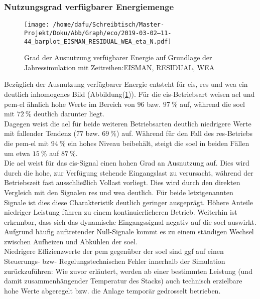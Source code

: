 \documentclass[onecolumn,10pt,titlepage]{article}
\begin{document}
\subsubsection{Nutzungsgrad verfügbarer Energiemenge}
\begin{figure}[H]
	\centering
	\texttt{[image: /home/dafu/Schreibtisch/Master-Projekt/Doku/Abb/Graph/eco/2019-03-02--11-44\_barplot\_EISMAN\_RESIDUAL\_WEA\_eta\_N.pdf]}
	\caption[Energie-Ausnutzung EIS, RES, WEA]{Grad der Ausnutzung verfügbarer Energie auf Grundlage der Jahressimulation mit Zeitreihen:EISMAN, RESIDUAL, WEA }
	\label{fig:analy_nC_etaN}
\end{figure}
Bezüglich der Ausnutzung verfügbarer Energie entsteht für \gls{eis}, \gls{res} und \gls{wea} ein deutlich inhomogenes Bild (Abbildung(\ref{fig:analy_nC_etaN})).
Für die \gls{eis}-Betriebsart weisen \gls{ael} und \gls{pem}-\gls{el} ähnlich hohe Werte im Bereich von $96$ bzw. $97~\%$ auf, während die \gls{soel} mit $72~\%$ deutlich darunter liegt.\\
Dagegen weist die \gls{ael} für beide weiteren Betriebsarten deutlich niedrigere Werte mit fallender Tendenz ($77$ bzw. $69~\%$) auf. Während für den Fall des \gls{res}-Betriebs die \gls{pem}-\gls{el} mit $94~\%$ ein hohes Niveau beibehält, steigt die \gls{soel} in beiden Fällen um etwa $15~\%$ auf $87~\%$.\\

Die \gls{ael} weist für das \gls{eis}-Signal einen hohen Grad an Ausnutzung auf. Dies wird durch die hohe, zur Verfügung stehende Eingangslast zu verursacht, während der Betriebszeit fast ausschließlich Vollast vorliegt. Dies wird durch den direkten Vergleich mit den Signalen \gls{res} und \gls{wea} deutlich. Für beide letztgenannten Signale ist dies diese Charakteristik deutlich geringer ausgeprägt. Höhere Anteile niedriger Leistung führen zu einem kontinuierlicheren Betrieb. Weiterhin ist erkennbar, dass sich das dynamische Eingangssignal negativ auf die \gls{soel} auswirkt. Aufgrund häufig auftretender Null-Signale kommt es zu einem ständigen Wechsel zwischen Aufheizen und Abkühlen der \gls{soel}.\\
Niedrigere Effizienzwerte der \gls{pem} gegenüber der \gls{soel} sind ggf auf einen Steuerungs- bzw- Regelungstechnischen Fehler innerhalb der Simulation zurückzuführen: %
Wie zuvor erläutert, werden ab einer bestimmten Leistung (und damit zusammenhängender Temperatur des Stacks)  auch technisch erzielbare hohe Werte abgeregelt bzw. die Anlage temporär gedrosselt betrieben.
\end{document}
